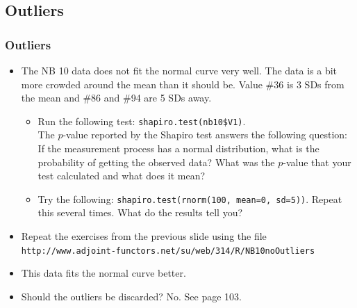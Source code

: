 \documentclass[t]{beamer}
\begin{document}
\subsection{Outliers}
\begin{frame}[t]\frametitle{Outliers}
\newcommand{\U}{\underline{\hspace{5pt}}}
{\begin{itemize}
\item The NB 10 data does not fit the normal curve very well.
   The data is a bit more crowded around the mean than it should be.
   Value \#36 is 3 SDs from the mean and \#86 and \#94 
    are 5 SDs away.\\
  \begin{itemize}
  \item Run the following test:  \texttt{shapiro.test(nb10\$V1)}.\\
         The $p$-value reported by the Shapiro test answers the following question:  
         If the measurement process has a normal distribution, what is the probability
         of getting the observed data?  What was the $p$-value that your test calculated
    and what does it mean?
  \item Try the following:
    \texttt{shapiro.test(rnorm(100, mean=0, sd=5))}.  Repeat this several times. What do the 
    results tell you?
  \end{itemize}
\item Repeat the exercises from the previous slide using the file\\
{\scriptsize  \texttt{http://www.adjoint-functors.net/su/web/314/R/NB10\U noOutliers}}\\
\item This data fits the normal curve better.
\item Should the outliers be discarded?  No.  See page 103.\\[10pt]
\end{itemize}
}
\end{frame}
\end{document}
